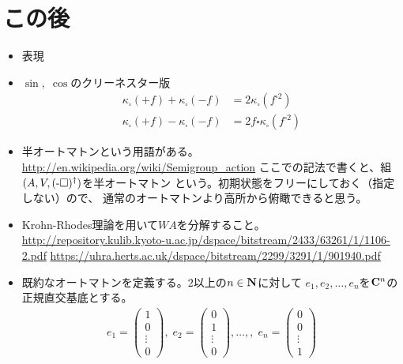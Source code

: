 \section{この後}\label{s1:この後} %
	\begin{itemize}\setlength{\itemsep}{-1mm} %
		\item 表現
		\item $\sin,\;\cos$のクリーネスター版
		\begin{equation*}\begin{split} %
			\kappa_\square(+f) + \kappa_\square(-f)
			&= 2\kappa_\square(f^{\square2}) \\
			\kappa_\square(+f) - \kappa_\square(-f)
			&= 2f\square\kappa_\square(f^{\square2})
		\end{split}\end{equation*} %
		\item 半オートマトンという用語がある。
		\url{http://en.wikipedia.org/wiki/Semigroup_action}
		ここでの記法で書くと、組$(A,V,(\myhere\square)^\dag)$を半オートマトン
		という。初期状態をフリーにしておく（指定しない）ので、
		通常のオートマトンより高所から俯瞰できると思う。
		\item Krohn-Rhodes理論を用いて$WA$を分解すること。
		\url{http://repository.kulib.kyoto-u.ac.jp/dspace/bitstream/2433/63261/1/1106-2.pdf}
		\url{https://uhra.herts.ac.uk/dspace/bitstream/2299/3291/1/901940.pdf}
		\item 既約なオートマトンを定義する。$2$以上の$n\in{\mathbf{N}}$に対して
		$e_1,e_2,\dots,e_n$を${\mathbf{C}}^n$の正規直交基底とする。
		\begin{equation*}\begin{split} %
			e_1=\begin{pmatrix}
			1 \\
			0 \\
			\vdots \\
			0
			\end{pmatrix},\; e_2=\begin{pmatrix}
			0 \\
			1 \\
			\vdots \\
			0
			\end{pmatrix},\dots,,\; e_n=\begin{pmatrix}
			0 \\
			0 \\
			\vdots \\
			1
			\end{pmatrix}
		\end{split}\end{equation*} %

\end{itemize}
